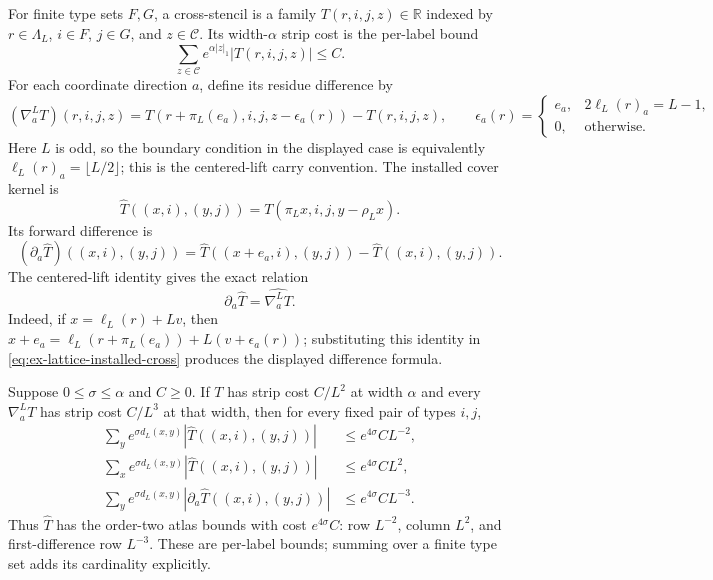 For finite type sets $F,G$, a cross-stencil is a family
$T(r,i,j,z)\in\mathbb R$ indexed by $r\in\Lambda_L$, $i\in F$,
$j\in G$, and $z\in\mathcal C$. Its width-$\alpha$ strip cost is the
per-label bound
\[
 \sum_{z\in\mathcal C} e^{\alpha|z|_1}|T(r,i,j,z)|\leq C.
\]
For each coordinate direction $a$, define its residue difference by
\[
 (\nabla_a^LT)(r,i,j,z)=T(r+\pi_L(e_a),i,j,z-\epsilon_a(r))-T(r,i,j,z),
 \qquad
 \epsilon_a(r)=\begin{cases}e_a,&2\ell_L(r)_a=L-1,\\0,&\text{otherwise.}\end{cases}
\]
Here $L$ is odd, so the boundary condition in the displayed case is
equivalently $\ell_L(r)_a=\lfloor L/2\rfloor$; this is the centered-lift carry convention.
The installed cover kernel is
\begin{equation}
 \widehat T((x,i),(y,j))=T(\pi_Lx,i,j,y-\rho_Lx).
 \label{eq:ex-lattice-installed-cross}
\end{equation}
Its forward difference is
\[
 (\partial_a\widehat T)((x,i),(y,j))
 =\widehat T((x+e_a,i),(y,j))-\widehat T((x,i),(y,j)).
\]
The centered-lift identity gives the exact relation
\begin{equation}
 \partial_a\widehat T=\widehat{\nabla_a^LT}.
 \label{eq:ex-lattice-install-difference}
\end{equation}
Indeed, if $x=\ell_L(r)+Lv$, then $x+e_a=\ell_L(r+\pi_L(e_a))+L(v+\epsilon_a(r))$;
substituting this identity in \eqref{eq:ex-lattice-installed-cross}
produces the displayed difference formula.

\begin{lemma}
\label{lem:ex-lattice-cross-atlas}
Suppose $0\leq\sigma\leq\alpha$ and $C\geq0$. If $T$ has strip
cost $C/L^2$ at width $\alpha$ and every $\nabla_a^LT$ has strip cost
$C/L^3$ at that width, then for every fixed pair of types $i,j$,
\begin{align*}
 \sum_y e^{\sigma d_L(x,y)}|\widehat T((x,i),(y,j))|
     &\leq e^{4\sigma}C L^{-2},\\
 \sum_x e^{\sigma d_L(x,y)}|\widehat T((x,i),(y,j))|
     &\leq e^{4\sigma}C L^2,\\
 \sum_y e^{\sigma d_L(x,y)}|\partial_a\widehat T((x,i),(y,j))|
     &\leq e^{4\sigma}C L^{-3}.
\end{align*}
Thus $\widehat T$ has the order-two atlas bounds with cost
$e^{4\sigma}C$: row $L^{-2}$, column $L^2$, and first-difference row
$L^{-3}$. These are per-label bounds; summing over a finite type set adds its
cardinality explicitly.
\end{lemma}

